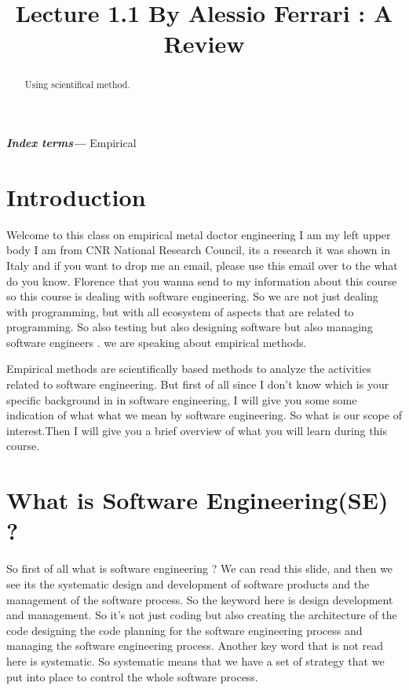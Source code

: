 \documentclass[conference, compsoc, twoside]{IEEEtran}
\begin{document}
\preto\tabular{\setcounter{magicrownumbers}{0}}
\newcommand\rownumber{\stepcounter{magicrownumbers}\arabic{magicrownumbers}}
\title{\Huge Lecture 1.1 By Alessio Ferrari : A Review}
\author{
}

\maketitle
\providecommand{\keywords}[1]{\textbf{\textit{Index terms---}} #1}
\begin{abstract}
Using scientifical method.
\end{abstract}

\keywords{Empirical}
\IEEEpeerreviewmaketitle

\section{Introduction}
Welcome to this class on empirical metal doctor engineering I am my left upper body I am from CNR National Research Council, its a research it was shown in Italy and if you want to drop me an email, please use this email over to the what do you know.
Florence that you wanna send to my information about this course so this course is dealing with software engineering.
So we are not just dealing with programming, but with all ecosystem of aspects that are related to programming.
So also testing but also designing software but also managing software engineers .
we are speaking about empirical methods.

Empirical methods are scientifically based methods to analyze the activities related to software engineering. 
But first of all since I don't know which is your specific background in in software engineering, 
I will give you some some indication of what what we mean by software engineering.
So what is our scope of interest.Then I will give you a brief overview of what you will learn during this course.
\section{What is Software Engineering(SE) ?} %
So first of all what is software engineering ? 
We can read this slide, and then we see its the systematic design and development of software products and the management of the software process. So the keyword here is design development and management. So it's not just coding but also creating the architecture of the code designing the code planning for the software engineering process and managing the software engineering process. Another key word that is not read here is systematic. So systematic means that we have a set of strategy that we put into place to control the whole software process.
\end{document}
